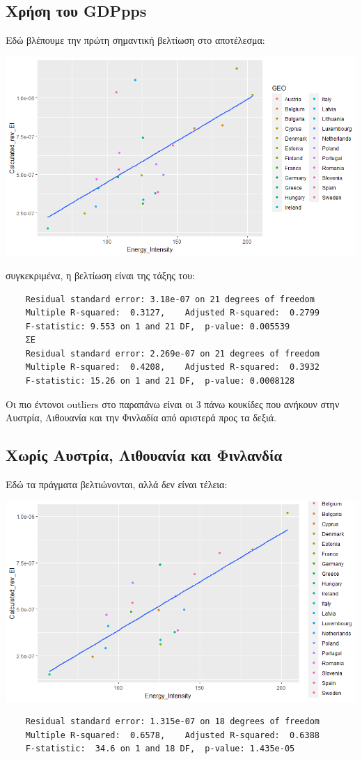 \documentclass[a4paper,twoside,10pt]{article}
\begin{document}
\subsection{Χρήση του GDPpps}
Εδώ βλέπουμε την πρώτη σημαντική βελτίωση στο αποτέλεσμα:
\begin{center}
	\includegraphics[width=0.7\linewidth]{images/Calculated_RI_gdpps}
\end{center}
συγκεκριμένα, η βελτίωση είναι της τάξης του:
\begin{verbatim}
	Residual standard error: 3.18e-07 on 21 degrees of freedom
	Multiple R-squared:  0.3127,	Adjusted R-squared:  0.2799 
	F-statistic: 9.553 on 1 and 21 DF,  p-value: 0.005539
	ΣΕ
	Residual standard error: 2.269e-07 on 21 degrees of freedom
	Multiple R-squared:  0.4208,	Adjusted R-squared:  0.3932 
	F-statistic: 15.26 on 1 and 21 DF,  p-value: 0.0008128
\end{verbatim}
	 Οι πιο έντονοι outliers στο παραπάνω είναι οι 3 πάνω κουκίδες που ανήκουν στην Αυστρία, Λιθουανία και την Φινλαδία από αριστερά προς τα δεξιά.

\subsection{Χωρίς Αυστρία, Λιθουανία και Φινλανδία}
Εδώ τα πράγματα βελτιώνονται, αλλά δεν είναι τέλεια:
\begin{center}
	\includegraphics[width=0.7\linewidth]{images/calculated_without_austria_lithuania_finland}
\end{center}
\begin{verbatim}
	Residual standard error: 1.315e-07 on 18 degrees of freedom
	Multiple R-squared:  0.6578,	Adjusted R-squared:  0.6388 
	F-statistic:  34.6 on 1 and 18 DF,  p-value: 1.435e-05
\end{verbatim}
\end{document}
